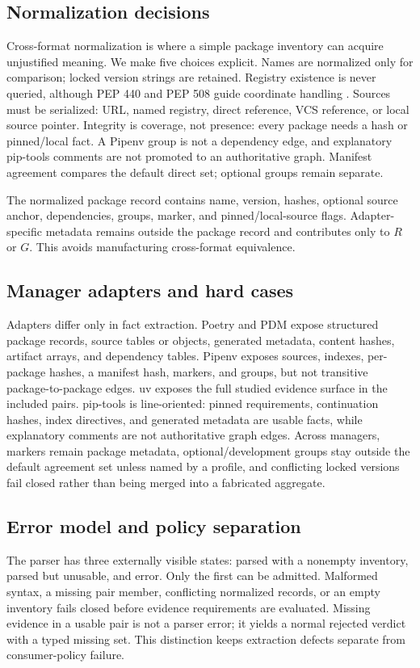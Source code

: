 \documentclass[10pt,conference]{IEEEtran}
\begin{document}
\subsection{Normalization decisions}
Cross-format normalization is where a simple package inventory can acquire unjustified meaning. We make five choices explicit. Names are normalized only for comparison; locked version strings are retained. Registry existence is never queried, although PEP 440 and PEP 508 guide coordinate handling \cite{pep440,pep508}. Sources must be serialized: URL, named registry, direct reference, VCS reference, or local source pointer. Integrity is coverage, not presence: every package needs a hash or pinned/local fact. A Pipenv group is not a dependency edge, and explanatory pip-tools comments are not promoted to an authoritative graph. Manifest agreement compares the default direct set; optional groups remain separate.

The normalized package record contains name, version, hashes, optional source anchor, dependencies, groups, marker, and pinned/local-source flags. Adapter-specific metadata remains outside the package record and contributes only to $R$ or $G$. This avoids manufacturing cross-format equivalence.

\subsection{Manager adapters and hard cases}
Adapters differ only in fact extraction. Poetry and PDM expose structured package records, source tables or objects, generated metadata, content hashes, artifact arrays, and dependency tables. Pipenv exposes sources, indexes, per-package hashes, a manifest hash, markers, and groups, but not transitive package-to-package edges. uv exposes the full studied evidence surface in the included pairs. pip-tools is line-oriented: pinned requirements, continuation hashes, index directives, and generated metadata are usable facts, while explanatory comments are not authoritative graph edges. Across managers, markers remain package metadata, optional/development groups stay outside the default agreement set unless named by a profile, and conflicting locked versions fail closed rather than being merged into a fabricated aggregate.

\subsection{Error model and policy separation}
The parser has three externally visible states: parsed with a nonempty inventory, parsed but unusable, and error. Only the first can be admitted. Malformed syntax, a missing pair member, conflicting normalized records, or an empty inventory fails closed before evidence requirements are evaluated. Missing evidence in a usable pair is not a parser error; it yields a normal rejected verdict with a typed missing set. This distinction keeps extraction defects separate from consumer-policy failure.
\end{document}
